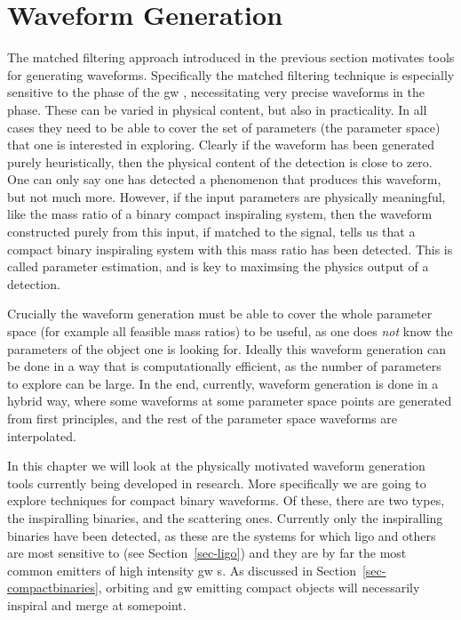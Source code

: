 \documentclass[
  10pt,
  a4paper,
  DIV=11,
  numbers=noendperiod,
  oneside]{scrreprt}
\DeclareRobustCommand{\[}{\begin{equation}}
\DeclareRobustCommand{\]}{\end{equation}}
\begin{document}

\hypertarget{waveform-generation}{%
\chapter{Waveform Generation}\label{waveform-generation}}

The matched filtering approach introduced in the previous section
motivates tools for generating waveforms. Specifically the matched
filtering technique is especially sensitive to the phase of the \gls{gw}
, necessitating very precise waveforms in the phase. These can be varied
in physical content, but also in practicality. In all cases they need to
be able to cover the set of parameters (the parameter space) that one is
interested in exploring. Clearly if the waveform has been generated
purely heuristically, then the physical content of the detection is
close to zero. One can only say one has detected a phenomenon that
produces this waveform, but not much more. However, if the input
parameters are physically meaningful, like the mass ratio of a binary
compact inspiraling system, then the waveform constructed purely from
this input, if matched to the signal, tells us that a compact binary
inspiraling system with this mass ratio has been detected. This is
called parameter estimation, and is key to maximsing the physics output
of a detection.

Crucially the waveform generation must be able to cover the whole
parameter space (for example all feasible mass ratios) to be useful, as
one does \emph{not} know the parameters of the object one is looking
for. Ideally this waveform generation can be done in a way that is
computationally efficient, as the number of parameters to explore can be
large. In the end, currently, waveform generation is done in a hybrid
way, where some waveforms at some parameter space points are generated
from first principles, and the rest of the parameter space waveforms are
interpolated.

In this chapter we will look at the physically motivated waveform
generation tools currently being developed in research. More
specifically we are going to explore techniques for compact binary
waveforms. Of these, there are two types, the inspiralling binaries, and
the scattering ones. Currently only the inspiralling binaries have been
detected, as these are the systems for which \gls{ligo} and others are
most sensitive to (see Section~\ref{sec-ligo}) and they are by far the
most common emitters of high intensity \gls{gw} s. As discussed in
Section~\ref{sec-compactbinaries}, orbiting and \gls{gw} emitting
compact objects will necessarily inspiral and merge at somepoint.
\end{document}
